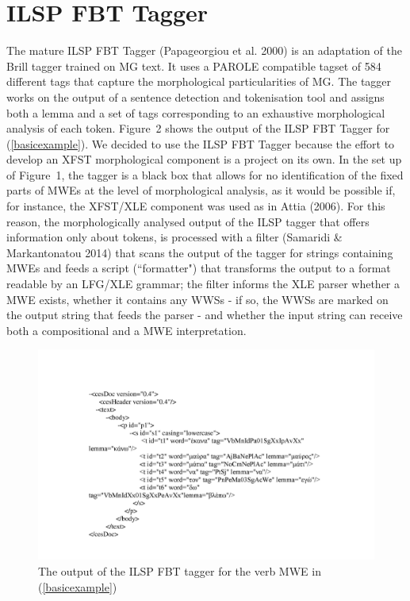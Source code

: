 \documentclass[output=paper,
modfonts
]{langscibook}
\begin{document}
\section{ILSP FBT Tagger}
The mature ILSP FBT Tagger (Papageorgiou et al. 2000) is an adaptation of the Brill tagger trained on MG text. It uses a PAROLE compatible tagset of 584 different tags that capture the morphological particularities of MG. The tagger works on the output of a sentence detection and tokenisation tool and assigns both a lemma and a set of tags corresponding to an exhaustive morphological analysis of each token. Figure~2 shows the output of the ILSP FBT Tagger for (\ref{basicexample}).
We decided to use the ILSP FBT Tagger because the effort to develop an XFST morphological component is a project on its own. In the set up of Figure~1, the tagger is a black box that allows for no identification of the fixed parts of MWEs at the level of morphological analysis, as it would be possible if, for instance, the XFST/XLE component was used as in Attia (2006). For this reason, the morphologically analysed output of the ILSP tagger that offers information only about tokens, is processed with a filter (Samaridi \& Markantonatou 2014) that scans the output of the tagger for strings containing MWEs and feeds a script (``formatter") that transforms the output to a format readable by an LFG/XLE grammar; the filter informs the XLE parser whether a MWE exists, whether it contains any WWSs - if so, the WWSs are marked on the output string that feeds the parser - and whether the input string can receive both a compositional and a MWE interpretation.
\begin{figure}[h!]
  \caption{The output of the ILSP FBT tagger for the verb MWE in (\ref{basicexample})}
  \centering
  \includegraphics[width=1.\textwidth]{figures/tagger_image}
\end{figure}
\end{document}
